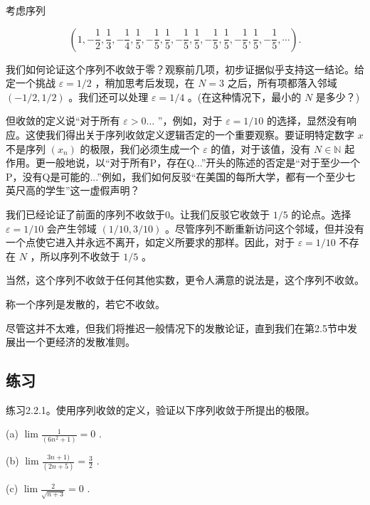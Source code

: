 \begin{Eg}
  \label{eg:2.2.7}
考虑序列

\[
\left( {1, - \frac{1}{2},\frac{1}{3}, - \frac{1}{4},\frac{1}{5}, - \frac{1}{5},\frac{1}{5}, - \frac{1}{5},\frac{1}{5}, - \frac{1}{5},\frac{1}{5}, - \frac{1}{5},\frac{1}{5}, - \frac{1}{5},\cdots }\right) .
\]

我们如何论证这个序列不收敛于零？观察前几项，初步证据似乎支持这一结论。给定一个挑战 \(\varepsilon  = 1/2\) ，稍加思考后发现，在 \(N = 3\) 之后，所有项都落入邻域 \(\left( {-1/2,1/2}\right)\) 。我们还可以处理 \(\varepsilon  = 1/4\) 。(在这种情况下，最小的 \(N\) 是多少？)

但收敛的定义说“对于所有 \(\varepsilon  > 0\ldots\) ”，例如，对于 \(\varepsilon  = 1/{10}\) 的选择，显然没有响应。这使我们得出关于序列收敛定义逻辑否定的一个重要观察。要证明特定数字 \(x\) 不是序列 \(\left( {x}_{n}\right)\) 的极限，我们必须生成一个 \(\varepsilon\) 的值，对于该值，没有 \(N \in  \mathbb{N}\) 起作用。更一般地说，以“对于所有P，存在Q...”开头的陈述的否定是“对于至少一个P，没有Q是可能的...”例如，我们如何反驳“在美国的每所大学，都有一个至少七英尺高的学生”这一虚假声明？

我们已经论证了前面的序列不收敛于0。让我们反驳它收敛于 \(1/5\) 的论点。选择 \(\varepsilon  = 1/{10}\) 会产生邻域 \(\left( {1/{10},3/{10}}\right)\) 。尽管序列不断重新访问这个邻域，但并没有一个点使它进入并永远不离开，如定义所要求的那样。因此，对于 \(\varepsilon  = 1/{10}\) 不存在 \(N\) ，所以序列不收敛于 \(1/5\) 。
\end{Eg}

当然，这个序列不收敛于任何其他实数，更令人满意的说法是，这个序列不收敛。 


\begin{Def}
  \label{def:2.2.8}
  称一个序列是发散的，若它不收敛。
\end{Def}

尽管这并不太难，但我们将推迟一般情况下的发散论证，直到我们在第2.5节中发展出一个更经济的发散准则。

\subsection{练习}

练习2.2.1。使用序列收敛的定义，验证以下序列收敛于所提出的极限。

(a) \(\lim \frac{1}{\left( 6{n}^{2} + 1\right) } = 0\) .

(b) \(\lim \frac{{3n} + 1)}{\left( 2n + 5\right) } = \frac{3}{2}\) .

(c) \(\lim \frac{2}{\sqrt{n + 3}} = 0\) .

